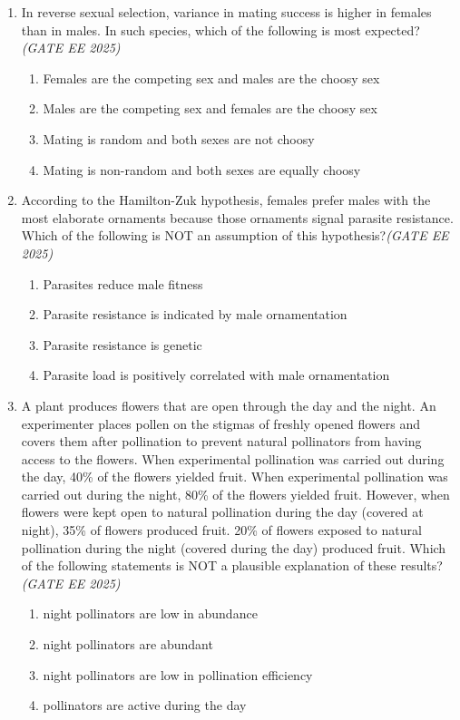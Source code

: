 \documentclass[11pt,a4paper]{article}
\begin{document}
\begin{enumerate}[leftmargin=*,label=\textbf{Q.\arabic*},resume]
\item In reverse sexual selection, variance in mating success is higher in females than in males. In such species, which of the following is most expected?\hfill \textit{(GATE EE 2025)}
\begin{multicols}{2}
\begin{enumerate}[label=(\Alph*)]
\item Females are the competing sex and males are the choosy sex
\item Males are the competing sex and females are the choosy sex
\item Mating is random and both sexes are not choosy
\item Mating is non-random and both sexes are equally choosy
\end{enumerate}
\end{multicols}

\item According to the Hamilton-Zuk hypothesis, females prefer males with the most elaborate ornaments because those ornaments signal parasite resistance. Which of the following is NOT an assumption of this hypothesis?\hfill \textit{(GATE EE 2025)}
\begin{multicols}{2}
\begin{enumerate}[label=(\Alph*)]
\item Parasites reduce male fitness
\item Parasite resistance is indicated by male ornamentation
\item Parasite resistance is genetic
\item Parasite load is positively correlated with male ornamentation
\end{enumerate}
\end{multicols}

\item A plant produces flowers that are open through the day and the night. An experimenter places pollen on the stigmas of freshly opened flowers and covers them after pollination to prevent natural pollinators from having access to the flowers. When experimental pollination was carried out during the day, 40\% of the flowers yielded fruit. When experimental pollination was carried out during the night, 80\% of the flowers yielded fruit. However, when flowers were kept open to natural pollination during the day (covered at night), 35\% of flowers produced fruit. 20\% of flowers exposed to natural pollination during the night (covered during the day) produced fruit. Which of the following statements is NOT a plausible explanation of these results?\hfill \textit{(GATE EE 2025)}
\begin{multicols}{2}
\begin{enumerate}[label=(\Alph*)]
\item night pollinators are low in abundance
\item night pollinators are abundant
\item night pollinators are low in pollination efficiency
\item pollinators are active during the day
\end{enumerate}
\end{multicols}


\end{enumerate}
\end{document}
